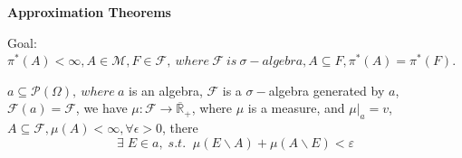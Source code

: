 \setcounter{lecture}{9}
\begin{center}
	\Large \bf Approximation Theorems
\end{center}
\vspace{0.25cm}

Goal: ${\pi ^*}\left( A \right) < \infty ,A \in \mathcal{M}, F \in \mathcal{F}, \ where \ \mathcal{F} \ is \ \sigma-algebra, A \subseteq F,{\pi ^*}\left( A \right) = {\pi ^*}\left( F \right)$.

\begin{theorem}
	$ a \subseteq \mathcal{P}(\Omega),\ where \  a $ is an algebra, $ \mathcal{F} $ is a $ \sigma- $algebra generated by $ a $, $ \mathcal{F}(a)=\mathcal{F} $, we have $\mu :\mathcal{F} \to \overline {{\mathbb{R}}}_ + $,  where  $ \mu $  is a measure, and  $\mu {|_a} = v$,  $ A \subseteq \mathcal{F}, \mu(A) < \infty, \forall \epsilon >0  $, there
	\begin{equation}
	\exists \;E \in a,\;s.t.\;\;\mu \left( {E\backslash A} \right) + \mu \left( {A\backslash E} \right) < \varepsilon
	\label{eq9.1}
	\end{equation}
	\label{thm9.1}
\end{theorem}

